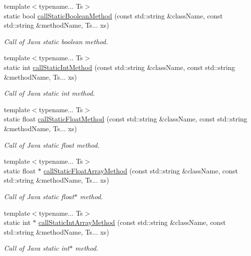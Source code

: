 \begin{DoxyCompactItemize}
{\footnotesize template$<$typename... Ts$>$ }\\static bool \hyperlink{classJniHelper_abe141f8f565c0852058f9c08952b5eac}{call\+Static\+Boolean\+Method} (const std\+::string \&class\+Name, const std\+::string \&method\+Name, Ts... xs)
\begin{DoxyCompactList}\small\item\em Call of Java static boolean method. \end{DoxyCompactList}\item 
{\footnotesize template$<$typename... Ts$>$ }\\static int \hyperlink{classJniHelper_a91319243246966249a5b5ff3b1110f5a}{call\+Static\+Int\+Method} (const std\+::string \&class\+Name, const std\+::string \&method\+Name, Ts... xs)
\begin{DoxyCompactList}\small\item\em Call of Java static int method. \end{DoxyCompactList}\item 
{\footnotesize template$<$typename... Ts$>$ }\\static float \hyperlink{classJniHelper_a67019482bf6cae8f91a828ab6372c7bb}{call\+Static\+Float\+Method} (const std\+::string \&class\+Name, const std\+::string \&method\+Name, Ts... xs)
\begin{DoxyCompactList}\small\item\em Call of Java static float method. \end{DoxyCompactList}\item 
{\footnotesize template$<$typename... Ts$>$ }\\static float $\ast$ \hyperlink{classJniHelper_ad3f793ae3cab1bfd61fc97fa4c4d2e65}{call\+Static\+Float\+Array\+Method} (const std\+::string \&class\+Name, const std\+::string \&method\+Name, Ts... xs)
\begin{DoxyCompactList}\small\item\em Call of Java static float$\ast$ method. \end{DoxyCompactList}\item 
{\footnotesize template$<$typename... Ts$>$ }\\static int $\ast$ \hyperlink{classJniHelper_a344d60af8e2b8ff94c1f7081d216f71d}{call\+Static\+Int\+Array\+Method} (const std\+::string \&class\+Name, const std\+::string \&method\+Name, Ts... xs)
\begin{DoxyCompactList}\small\item\em Call of Java static int$\ast$ method. \end{DoxyCompactList}\item 

\end{DoxyCompactItemize}
